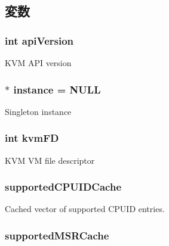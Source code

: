 \subsection{変数}
\hypertarget{classKvm_ab3562fc781db97a1faac4c863e257ca9}{
\subsubsection[{apiVersion}]{\setlength{\rightskip}{0pt plus 5cm}int {\bf apiVersion}}}
\label{classKvm_ab3562fc781db97a1faac4c863e257ca9}
KVM API version \hypertarget{classKvm_a64c6606364bd27581f929800703a402e}{
\subsubsection[{instance}]{ $\ast$ {\bf instance} = NULL}}
\label{classKvm_a64c6606364bd27581f929800703a402e}
Singleton instance \hypertarget{classKvm_af331fe85a8df29abc3f2d301b0afddc2}{
\subsubsection[{kvmFD}]{\setlength{\rightskip}{0pt plus 5cm}int {\bf kvmFD}}}
\label{classKvm_af331fe85a8df29abc3f2d301b0afddc2}
KVM VM file descriptor \hypertarget{classKvm_a3d5dc75656640e2eb3b52c27e4497b75}{
\subsubsection[{supportedCPUIDCache}]{ {\bf supportedCPUIDCache}}}
\label{classKvm_a3d5dc75656640e2eb3b52c27e4497b75}
Cached vector of supported CPUID entries. \hypertarget{classKvm_a5553ee613be7488e7c7c28058dc7d487}{
\subsubsection[{supportedMSRCache}]{ {\bf supportedMSRCache}}}
